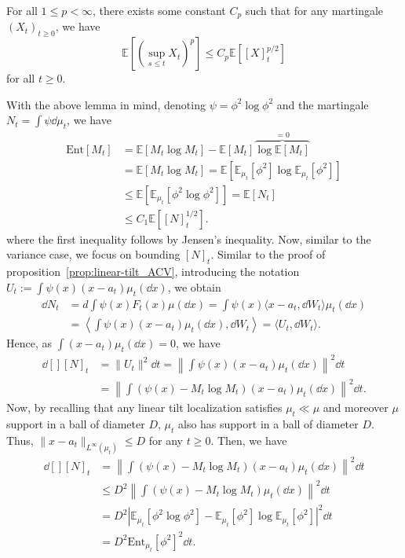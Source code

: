 \begin{lemma}
  For all \(1 \le p < \infty\), there exists some constant \(C_p\) such that for any martingale \((X_t)_{t \ge 0}\),
  we have 
  \[\mathbb{E}\left[\left(\sup_{s \le t} X_t\right)^p\right] \le C_p \mathbb{E}\left[[X]_t^{p / 2}\right]\]
  for all \(t \ge 0\).
\end{lemma}

With the above lemma in mind, denoting \(\psi = \phi^2 \log \phi^2\) and the martingale \(N_t = \int \psi \dd \mu_t\),
we have 
\begin{equation}\label{eq:entropy_bound}
  \begin{split}
    \text{Ent}[M_t] & = \mathbb{E}[M_t\log M_t] - \mathbb{E}[M_t]\overbrace{\log\mathbb{E}[M_t]}^{= 0}\\ 
      & = \mathbb{E}[M_t\log M_t] = \mathbb{E}[\mathbb{E}_{\mu_t}[\phi^2] \log\mathbb{E}_{\mu_t}[\phi^2]]\\
      & \le \mathbb{E}[\mathbb{E}_{\mu_t}[\phi^2 \log \phi^2]] = \mathbb{E}[N_t]\\ 
      & \le C_1 \mathbb{E}\left[[N]_t^{1 / 2}\right].
  \end{split}
\end{equation}
where the first inequality follows by Jensen's inequality. Now, similar to the variance case, we focus on 
bounding \([N]_t\). Similar to the proof of proposition~\ref{prop:linear-tilt_ACV}, introducing the notation  
\(U_t := \int \psi(x)(x - a_t)\mu_t(\dd x)\), we obtain
\begin{align*}
  \dd N_t & = d \int \psi(x) F_t(x) \mu(\dd x) = \int \psi(x) \langle x - a_t, \dd W_t \rangle \mu_t(\dd x)\\
  & = \left\langle \int \psi(x)(x - a_t)\mu_t(\dd x), \dd W_t\right\rangle = \langle U_t, \dd W_t\rangle.
\end{align*}
Hence, as \(\int (x - a_t) \mu_t(\dd x) = 0\), we have
\begin{align*}
  \dd[] [N]_t & = \|U_t\|^2 \dd t = \left\|\int \psi(x)(x - a_t)\mu_t(\dd x)\right\|^2 \dd t\\
  & = \left\|\int (\psi(x) - M_t \log M_t)(x - a_t)\mu_t(\dd x)\right\|^2 \dd t.
\end{align*}
Now, by recalling that any linear tilt localization satisfies \(\mu_t \ll \mu\) and moreover 
\(\mu\) support in a ball of diameter \(D\), \(\mu_t\) also has support in a ball of diameter \(D\). 
Thus, \(\|x - a_t\|_{L^\infty(\mu_t)} \le D\) for any \(t \ge 0\). Then, we have  
\begin{align*}
  \dd[] [N]_t & = \left\|\int (\psi(x) - M_t \log M_t)(x - a_t)\mu_t(\dd x)\right\|^2 \dd t\\
  & \le D^2 \left\|\int (\psi(x) - M_t \log M_t)\mu_t(\dd x)\right\|^2 \dd t\\
  & = D^2 \left|\mathbb{E}_{\mu_t}[\phi^2 \log \phi^2] - \mathbb{E}_{\mu_t}[\phi^2] \log\mathbb{E}_{\mu_t}[\phi^2]\right|^2 \dd t\\
  & = D^2 \text{Ent}_{\mu_t}[\phi^2]^2 \dd t.
\end{align*}
